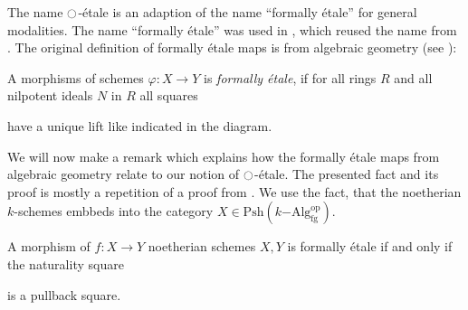 \documentclass[9pt,twosided]{amsart}
\begin{document}
The name ${\ocircle}$-étale is an adaption of the name ``formally étale'' for general modalities.
The name ``formally étale'' was used in \cite{wellen-thesis}, which reused the name from \cite{SyntheticPDEs}.
The original definition of formally étale maps is from algebraic geometry (see \cite[§ 17]{GrothendieckDieudonne}):
\begin{defn}
  A morphisms of schemes $\varphi:X\to Y$ is \emph{formally étale},
  if for all rings $R$ and all nilpotent ideals $N$ in $R$ all squares
  \begin{center}
  \end{center}
  have a unique lift like indicated in the diagram.
\end{defn}
We will now make a remark which explains how the formally étale maps from algebraic geometry relate to our notion of ${\ocircle}$-étale.
The presented fact and its proof is mostly a repetition of a proof from \cite[Section 4.4]{wellen-thesis}.
We use the fact, that the noetherian $k$-schemes embbeds into the category $X\in\mathrm{Psh}(k\mathrm{-Alg}^\mathrm{op}_{\mathrm{fg}})$.
\begin{rmk}
  A morphism of $f:X\to Y$ noetherian schemes $X,Y$ is formally étale if and only if the naturality square
  \begin{center}
  \end{center}
  is a pullback square.
\end{rmk}
\end{document}
